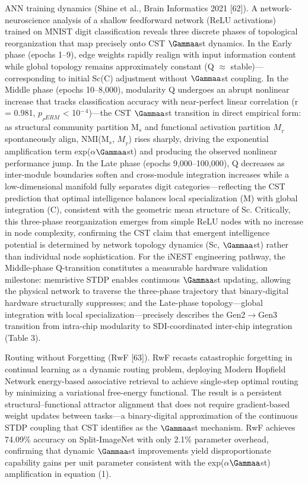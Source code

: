 \documentclass[a4paper,12pt]{article}
\begin{document}
ANN training dynamics (Shine et al., Brain Informatics 2021 [62]). A network-neuroscience analysis of a shallow feedforward network (ReLU activations) trained on MNIST digit classification reveals three discrete phases of topological reorganization that map precisely onto CST $\Gammaa$st dynamics. In the Early phase (epochs 1--9), edge weights rapidly realign with input information content while global topology remains approximately constant (Q $\approx$ stable)---corresponding to initial Sc(C) adjustment without $\Gammaa$st coupling. In the Middle phase (epochs 10--8,000), modularity Q undergoes an abrupt nonlinear increase that tracks classification accuracy with near-perfect linear correlation (r = 0.981, $p_{_PERM}$ < 10$^{-}$$^4$)---the CST $\Gammaa$st transition in direct empirical form: as structural community partition M$_s$ and functional activation partition $M_{_T}$ spontaneously align, NMI(M$_s$, $M_{_T}$) rises sharply, driving the exponential amplification term exp($\alpha$\cdot$\Gammaa$st) and producing the observed nonlinear performance jump. In the Late phase (epochs 9,000--100,000), Q decreases as inter-module boundaries soften and cross-module integration increases while a low-dimensional manifold fully separates digit categories---reflecting the CST prediction that optimal intelligence balances local specialization (M) with global integration (C), consistent with the geometric mean structure of Sc. Critically, this three-phase reorganization emerges from simple ReLU nodes with no increase in node complexity, confirming the CST claim that emergent intelligence potential is determined by network topology dynamics (Sc, $\Gammaa$st) rather than individual node sophistication. For the iNEST engineering pathway, the Middle-phase Q-transition constitutes a measurable hardware validation milestone: memristive STDP enables continuous $\Gammaa$st updating, allowing the physical network to traverse the three-phase trajectory that binary-digital hardware structurally suppresses; and the Late-phase topology---global integration with local specialization---precisely describes the Gen2$\rightarrow$Gen3 transition from intra-chip modularity to SDI-coordinated inter-chip integration (Table 3).


Routing without Forgetting (RwF [63]). RwF recasts catastrophic forgetting in continual learning as a dynamic routing problem, deploying Modern Hopfield Network energy-based associative retrieval to achieve single-step optimal routing by minimizing a variational free-energy functional. The result is a persistent structural--functional attractor alignment that does not require gradient-based weight updates between tasks---a binary-digital approximation of the continuous STDP coupling that CST identifies as the $\Gammaa$st mechanism. RwF achieves 74.09\% accuracy on Split-ImageNet with only 2.1\% parameter overhead, confirming that dynamic $\Gammaa$st improvements yield disproportionate capability gains per unit parameter consistent with the exp($\alpha$\cdot$\Gammaa$st) amplification in equation (1).
\end{document}
